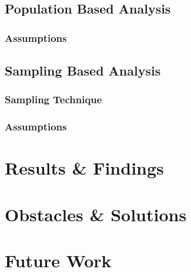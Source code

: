 \documentclass{article}
\begin{document}
\subsection{Population Based Analysis}
\subsubsection{Assumptions}



\subsection{Sampling Based Analysis}
\subsubsection{Sampling Technique}


\subsubsection{Assumptions}



\section{Results \& Findings}






\section{Obstacles \& Solutions}




\section{Future Work}
\end{document}
